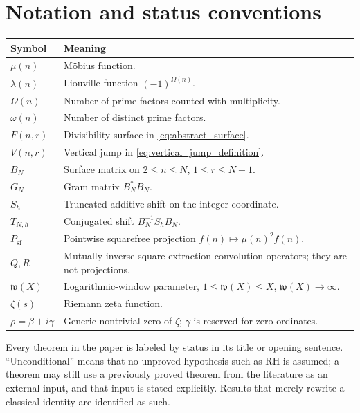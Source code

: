 \documentclass[11pt]{amsart}
\numberwithin{equation}{section}
\theoremstyle{plain}
\theoremstyle{definition}
\theoremstyle{remark}
\newcommand{\mob}{\mu}
\newcommand{\liou}{\lambda}
\newcommand{\Fsurf}{F}
\newcommand{\Vjump}{V}
\newcommand{\what}{\mathfrak w}
\begin{document}
\section{Notation and status conventions}
\label{sec:notation}

\begin{center}
\begin{tabular}{>{\raggedright\arraybackslash}p{} >{\raggedright\arraybackslash}p{}}
\toprule
Symbol & Meaning\\
\midrule
$\mob(n)$ & Möbius function.\\
$\liou(n)$ & Liouville function $(-1)^{\Omega(n)}$.\\
$\Omega(n)$ & Number of prime factors counted with multiplicity.\\
$\omega(n)$ & Number of distinct prime factors.\\
$\Fsurf(n,r)$ & Divisibility surface in \eqref{eq:abstract_surface}.\\
$\Vjump(n,r)$ & Vertical jump in \eqref{eq:vertical_jump_definition}.\\
$B_N$ & Surface matrix on $2\le n\le N$, $1\le r\le N-1$.\\
$G_N$ & Gram matrix $B_N^*B_N$.\\
$S_h$ & Truncated additive shift on the integer coordinate.\\
$T_{N,h}$ & Conjugated shift $B_N^{-1}S_hB_N$.\\
$P_{\mathrm{sf}}$ & Pointwise squarefree projection $f(n)\mapsto\mob(n)^2f(n)$.\\
$Q,R$ & Mutually inverse square-extraction convolution operators; they are not projections.\\
$\what(X)$ & Logarithmic-window parameter, $1\le\what(X)\le X$, $\what(X)\to\infty$.\\
$\zeta(s)$ & Riemann zeta function.\\
$\rho=\beta+i\gamma$ & Generic nontrivial zero of $\zeta$; $\gamma$ is reserved for zero ordinates.\\
\bottomrule
\end{tabular}
\end{center}

Every theorem in the paper is labeled by status in its title or opening sentence.  ``Unconditional'' means that no unproved hypothesis such as RH is assumed; a theorem may still use a previously proved theorem from the literature as an external input, and that input is stated explicitly.  Results that merely rewrite a classical identity are identified as such.
\end{document}
